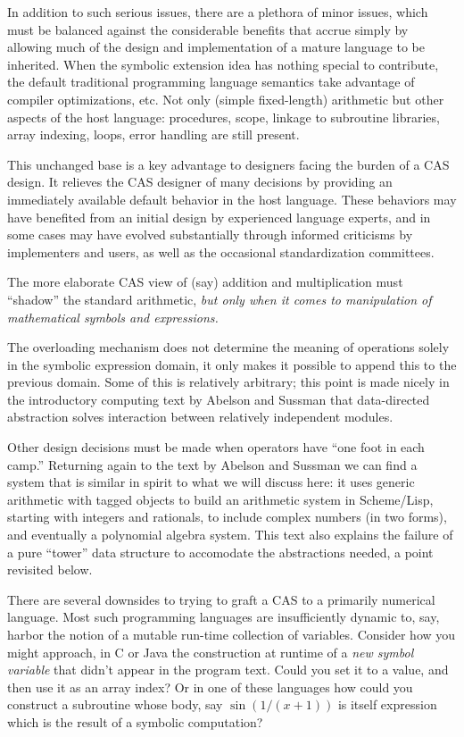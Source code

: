 \documentclass{article}
\begin{document}
{In addition to such serious issues, there are a plethora of minor
issues, which must be balanced against the considerable benefits that
accrue simply by allowing much of the design and implementation of a
mature language to be inherited.  When the symbolic extension idea has
nothing special to contribute, the default traditional programming language semantics
take advantage
of compiler optimizations, etc.  
Not only (simple fixed-length) arithmetic
but other aspects of the host language: procedures, scope,
linkage to subroutine libraries, array indexing, loops, error
handling are still present.


This unchanged base is a key advantage to designers facing the burden
of a CAS design. It relieves the CAS designer of many decisions by
providing an immediately available default behavior in the host
language.  These behaviors may have benefited from an initial design
by experienced language experts, and in some cases may have evolved
substantially through informed criticisms by implementers and users,
as well as the occasional standardization committees.

The more elaborate CAS view of (say)
addition and multiplication must ``shadow'' the standard arithmetic,
{\em but only when it comes to manipulation of mathematical symbols and
expressions.}

The overloading mechanism does not determine the meaning of
operations solely in the symbolic expression domain, it only makes
it possible to append this to the previous domain.
Some of this is relatively arbitrary; this point is made nicely in the introductory
computing text by Abelson and Sussman \cite{SICP} that data-directed
abstraction solves interaction between relatively independent modules.

Other design decisions must be made when operators have ``one foot in
each camp.''
{Returning again to the text by Abelson and Sussman \cite{SICP}
we can find a system that is similar in spirit to what we will
discuss here:
it uses generic arithmetic with tagged objects to build an arithmetic system
in Scheme/Lisp, starting with integers and rationals, to include complex
numbers (in two forms), and eventually a polynomial algebra system. This
text also explains the failure of a pure ``tower'' data structure to accomodate
the abstractions needed, a point revisited below.}

There are several downsides to trying to graft a CAS to a primarily
numerical language.  Most such programming languages are insufficiently
dynamic to, say, harbor the notion of a mutable run-time collection of
variables.  Consider how you might approach, in C or Java the
construction at runtime of a {\em new symbol variable} that didn't
appear in the program text. Could you set it to a value, and then use
it as an array index?  Or in one of these languages how
could you construct a subroutine whose body, say $\sin(1/(x+1))$ is itself
expression which is the result of a symbolic computation?

}
\end{document}
